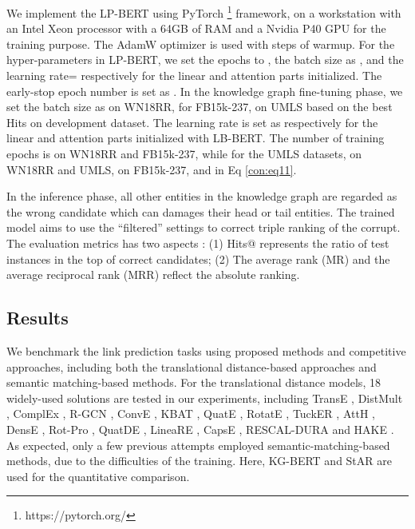 \documentclass[journal]{IEEEtran}
\begin{document}
We implement the LP-BERT using PyTorch \footnote{https://pytorch.org/} framework, on a workstation with an Intel Xeon processor with a 64GB of RAM and a Nvidia P40 GPU for the training purpose. The AdamW optimizer is used with  steps of warmup. For the hyper-parameters in LP-BERT, we set the epochs to , the batch size as , and the learning rate= respectively for the linear and attention parts initialized. The early-stop epoch number is set as . In the knowledge graph fine-tuning phase, we set the batch size as  on WN18RR,  for FB15k-237,  on UMLS based on the best Hits on development dataset. The learning rate is set as  respectively for the linear and attention parts initialized with LB-BERT. The number of training epochs is  on WN18RR and FB15k-237, while  for the UMLS datasets,  on WN18RR and UMLS,  on FB15k-237, and  in Eq \ref{con:eq11}.


In the inference phase, all other entities in the knowledge graph are regarded as the wrong candidate which can damages their head or tail entities. The trained model aims to use the ``filtered'' settings to correct triple ranking of the corrupt. The evaluation metrics has two aspects : (1) Hits@ represents the ratio of test instances in the top  of correct candidates; (2) The average rank (MR) and the average reciprocal rank (MRR) reflect the absolute ranking.

\subsection{Results}

We benchmark the link prediction tasks using proposed methods and competitive approaches, including both the translational distance-based approaches and semantic matching-based methods. For the translational distance models, 18 widely-used solutions are tested in our experiments, including TransE \cite{bordes2013translating}, DistMult \cite{yang2014embedding}, ComplEx \cite{trouillon2016complex}, R-GCN \cite{schlichtkrull2018modeling}, ConvE \cite{dettmers2018convolutional}, KBAT \cite{nathani2019learning}, QuatE \cite{zhang2019quaternion}, RotatE \cite{sun2018rotate}, TuckER \cite{balavzevic2019tucker}, AttH \cite{chami2020low}, DensE \cite{lu2020dense}, Rot-Pro \cite{song2021rot}, QuatDE \cite{gao2021quatde}, LineaRE \cite{peng2020lineare}, CapsE \cite{vu2019capsule}, RESCAL-DURA \cite{zhang2020duality} and HAKE \cite{zhang2020learning}. As expected, only a few previous attempts employed semantic-matching-based methods, due to the difficulties of the training. Here, KG-BERT \cite{yao2019kg} and StAR \cite{wang2021structure} are used for the quantitative comparison. 
\end{document}
